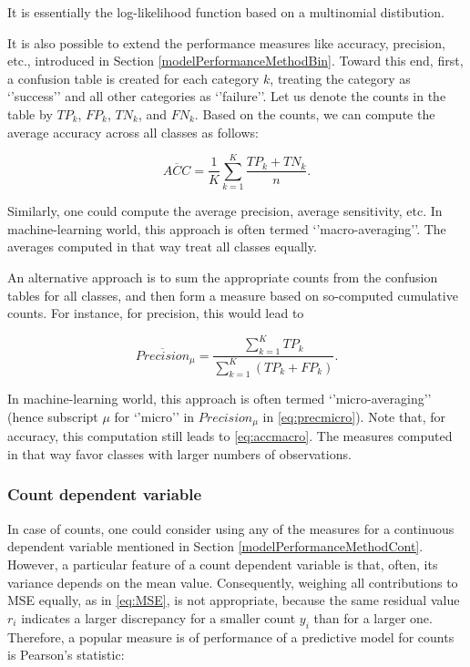 \documentclass[12pt,]{krantz}
\begin{document}
It is essentially the log-likelihood function based on a multinomial distibution.

It is also possible to extend the performance measures like accuracy, precision, etc., introduced in Section \ref{modelPerformanceMethodBin}. Toward this end, first, a confusion table is created for each category \(k\), treating the category as `'success'' and all other categories as `'failure''. Let us denote the counts in the table by \(TP_k\), \(FP_k\), \(TN_k\), and \(FN_k\). Based on the counts, we can compute the average accuracy across all classes as follows:

\begin{equation}
\overline{ACC} = \frac{1}{K}\sum_{k=1}^K\frac{TP_k+TN_k}{n}.
\label{eq:accmacro}
\end{equation}

Similarly, one could compute the average precision, average sensitivity, etc. In machine-learning world, this approach is often termed `'macro-averaging''. The averages computed in that way treat all classes equally.

An alternative approach is to sum the appropriate counts from the confusion tables for all classes, and then form a measure based on so-computed cumulative counts. For instance, for precision, this would lead to

\begin{equation}
\overline{Precision}_{\mu} = \frac{\sum_{k=1}^K TP_k}{\sum_{k=1}^K (TP_k+FP_k)}.
\label{eq:precmicro}
\end{equation}

In machine-learning world, this approach is often termed `'micro-averaging'' (hence subscript \(\mu\) for `'micro'' in \(Precision_{\mu}\) in \eqref{eq:precmicro}). Note that, for accuracy, this computation still leads to \eqref{eq:accmacro}. The measures computed in that way favor classes with larger numbers of observations.

\hypertarget{modelPerformanceMethodCount}{%
\subsubsection{Count dependent variable}\label{modelPerformanceMethodCount}}

In case of counts, one could consider using any of the measures for a continuous dependent variable mentioned in Section \ref{modelPerformanceMethodCont}. However, a particular feature of a count dependent variable is that, often, its variance depends on the mean value. Consequently, weighing all contributions to MSE equally, as in \eqref{eq:MSE}, is not appropriate, because the same residual value \(r_i\) indicates a larger discrepancy for a smaller count \(y_i\) than for a larger one. Therefore, a popular measure is of performance of a predictive model for counts is Pearson's statistic:
\end{document}
